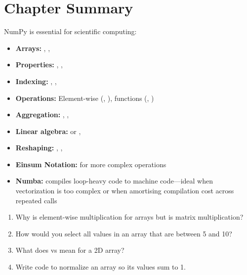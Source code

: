 \section{Chapter Summary}
\label{sec:numpy-summary}

NumPy is essential for scientific computing:

\begin{itemize}
    \item \textbf{Arrays:} , , 
    \item \textbf{Properties:} , , 
    \item \textbf{Indexing:} , , 
    \item \textbf{Operations:} Element-wise (\py{+}, \py{*}), functions (, )
    \item \textbf{Aggregation:} , , 
    \item \textbf{Linear algebra:}  or , 
    \item \textbf{Reshaping:} , , 
    \item \textbf{Einsum Notation:} for more complex operations
    \item \textbf{Numba:}  compiles loop-heavy code to machine code---ideal when vectorization is too complex or when amortising compilation cost across repeated calls
\end{itemize}

\begin{ponder}
\begin{enumerate}
    \item Why is  element-wise multiplication for arrays but  is matrix multiplication?
    \item How would you select all values in an array that are between 5 and 10?
    \item What does  vs  mean for a 2D array?
    \item Write code to normalize an array so its values sum to 1.
\end{enumerate}
\end{ponder}

